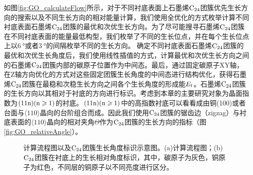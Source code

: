 如图\ref{fig:GO_calculateFlow}所示，对于不同衬底表面上石墨烯$\rm{C_{24}}$团簇优先生长方向的搜索以及不同生长方向的相对能量计算，我们使用全优化的方式枚举计算不同衬底表面石墨烯$\rm{C_{24}}$团簇的最优和次优生长方向。为了尽可能搜寻石墨烯$\rm{C_{24}}$团簇在不同衬底表面的能量最低构型，我们枚举了不同的生长位点，并在每个生长位点上以$\SI{6}{\degree}$或者$\SI{3}{\degree}$的间隔枚举不同的生长方向。 确定不同衬底表面石墨烯$\rm{C_{24}}$团簇的最优和次优生长角度后，我们使用线性插值的方式，计算最优和次优生长方向之间的石墨烯$\rm{C_{24}}$团簇内部的碳原子位置作为中间态。最后，通过固定碳原子XY轴，在Z轴方向优化的方式对这些固定团簇生长角度的中间态进行结构优化，获得石墨烯$\rm{C_{24}}$团簇在最稳和次稳生长方向之间各个生长角度的形成能$E_{\rm{f}}$。石墨烯$\rm{C_{24}}$团簇的生长方向以其相对于衬底的方向进行标识。考虑到本章的主要研究对象为晶面指数为$\rm{(11n)(n \geqslant 1)}$的衬底。$\rm{(11n)(n \geqslant 1)}$中的高指数衬底可以看看成由铜(100)或者台面与$\langle 110\rangle$晶向的台阶组合而成。因此我们使用$\rm{C_{24}}$团簇的锯齿边（zigzag）与衬底表面的$\langle 110\rangle$晶向的相对夹角$\Theta$作为$\rm{C_{24}}$团簇的生长方向的指标（图\ref{fig:GO_relativeAngle}）。

\begin{figure}[htb]
    \caption{计算流程图以及$\rm{C_{24}}$团簇生长角度标识示意图。(a)计算流程图；(b)$\rm{C_{24}}$团簇在衬底上的生长相对角度标识，其中，碳原子为灰色，铜原子为红色，不同层的铜原子以不同亮度进行区分。}
    \label{fig:GO_calculateFlow_relativeAngle}
\end{figure}

